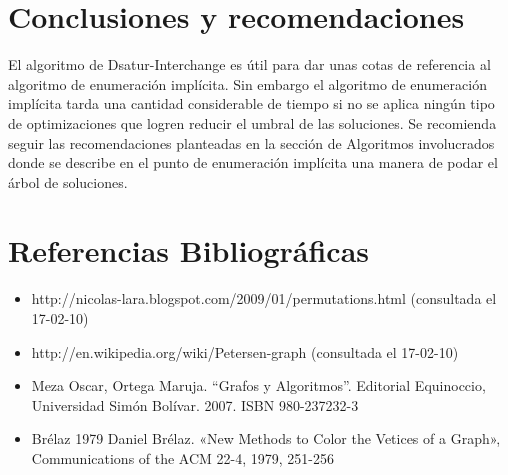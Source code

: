 \documentclass[a4paper,10pt]{article}
\begin{document}
\section{Conclusiones y recomendaciones}
El algoritmo de Dsatur-Interchange es útil para dar unas cotas de referencia al algoritmo de enumeración implícita. Sin 
embargo el algoritmo de enumeración implícita tarda una cantidad considerable de tiempo si no se aplica ningún tipo de optimizaciones que logren 
reducir el umbral de las soluciones. Se recomienda seguir las recomendaciones planteadas en la sección de Algoritmos involucrados donde se describe en el punto de enumeración implícita una manera de podar el árbol de soluciones.

\section{Referencias Bibliográficas}
\begin{itemize}
 \item http://nicolas-lara.blogspot.com/2009/01/permutations.html (consultada el 17-02-10)
\item http://en.wikipedia.org/wiki/Petersen-graph (consultada el 17-02-10)
\item Meza Oscar, Ortega Maruja. “Grafos y Algoritmos”. Editorial Equinoccio, Universidad Simón Bolívar. 2007. ISBN 980-237232-3
\item Brélaz 1979 Daniel Brélaz. «New Methods to Color the Vetices of a Graph», Communications of the ACM 22-4, 1979, 251-256
\end{itemize}
\end{document}
